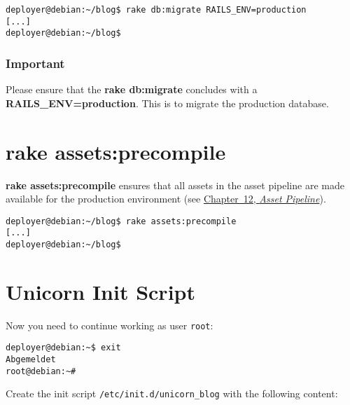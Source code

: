 \documentclass[a4paper]{book}
\newcounter{tab}[chapter]
\newcommand{\chap}[1]{\newpage\thispagestyle{empty}\chapter{#1}\label{chap:\thechapter}}
\begin{document}
\begin{shaded}\begin{verbatim}
deployer@debian:~/blog$ rake db:migrate RAILS_ENV=production
[...]
deployer@debian:~/blog$
\end{verbatim}\end{shaded}

\subsection{Important}\label{important-18}

Please ensure that the \textbf{rake db:migrate} concludes with a \textbf{RAILS\_ENV=production}. This is to migrate the production database.

\chap{rake assets:precompile}\label{rake-assetsprecompile-1}

\textbf{rake assets:precompile} ensures that all assets in the asset pipeline are made available for the production environment (see \hyperref[assetux5fpipeline]{Chapter~12, \emph{Asset Pipeline}}).

\begin{shaded}\begin{verbatim}
deployer@debian:~/blog$ rake assets:precompile
[...]
deployer@debian:~/blog$
\end{verbatim}\end{shaded}

\chap{Unicorn Init Script}\label{unicorn-init-script}

Now you need to continue working as user \texttt{root}:

\begin{shaded}\begin{verbatim}
deployer@debian:~$ exit
Abgemeldet
root@debian:~#
\end{verbatim}\end{shaded}

Create the init script \texttt{/etc/init.d/unicorn\_blog} with the following content:
\end{document}
